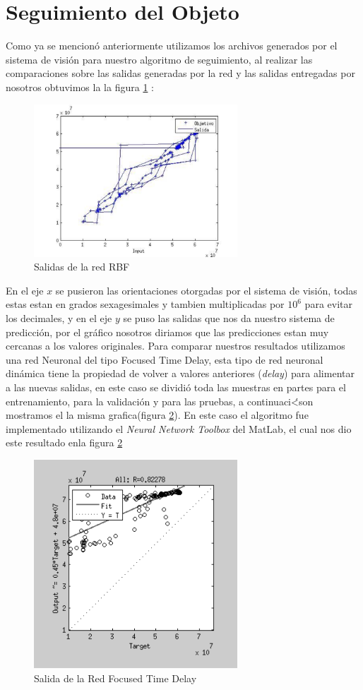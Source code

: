 \section{Seguimiento del Objeto}
Como  ya se mencion\'o anteriormente utilizamos los archivos generados por el sistema de visi\'on para nuestro algoritmo de seguimiento, al realizar las comparaciones sobre las salidas generadas por la red y las salidas entregadas por nosotros obtuvimos la la figura \ref{fig_sa_RBF} :
\begin{figure}
	\centering
	\includegraphics[width=3.0in]{prueba_sin.pdf}
	\caption{Salidas de la red RBF}
	\label{fig_sa_RBF}
\end{figure}
En el eje $x$ se pusieron las orientaciones otorgadas por el sistema de visi\'on, todas estas estan en grados sexagesimales y tambien multiplicadas por $10^{6} $ para evitar los decimales, y en el eje $y$ se puso las salidas que nos da nuestro sistema de predicci\'on, por el gr\'afico nosotros diriamos  que las predicciones estan muy cercanas a los valores originales.
Para comparar nuestros resultados utilizamos una red Neuronal del tipo Focused Time Delay, esta tipo de red neuronal din\'amica tiene la propiedad de volver a valores anteriores (\textit{delay}) para alimentar a las nuevas salidas, en este caso se dividi\'o toda las muestras en partes para el entrenamiento, para la validaci\'on y para las pruebas, a continuaci\'<son mostramos el la misma grafica(figura \ref{fig_time}). En este caso el algoritmo fue implementado utilizando el  \textit{Neural Network Toolbox} del MatLab, el cual nos dio este resultado enla figura \ref{fig_time}
\begin{figure}
	\centering
	\includegraphics[width=3.0in]{otra_sal.pdf}
	\caption{Salida de la Red Focused Time Delay}
	\label{fig_time}
\end{figure}

